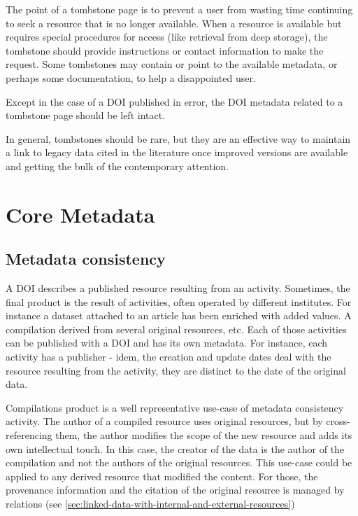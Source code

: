 \documentclass[11pt,a4paper]{ivoa}
\begin{document}
The point of a tombstone page is to prevent a user from wasting time continuing to seek a resource that is no longer available. When a resource is available but requires special procedures for access (like retrieval from deep storage), the tombstone should provide instructions or contact information to make the request. Some tombstones may contain or point to the available metadata, or perhaps some documentation, to help a disappointed user.

Except in the case of a DOI published in error, the DOI metadata related to a tombstone page should be left intact.

In general, tombstones should be rare, but they are an effective way to maintain a link to legacy data cited in the literature once improved versions are available and getting the bulk of the contemporary attention.

\section{Core Metadata}\hypertarget{core-metadata}{}\label{sec:core-metadata}

\subsection{Metadata consistency}\hypertarget{metadata-consistency}{}\label{sec:metadata-consistency}

A DOI describes a published resource resulting from an activity.  \newline
Sometimes, the final product is the result of activities, often operated by different institutes. For instance a dataset attached to an article has been enriched with added values. A compilation derived from several original resources, etc.\newline
Each of those activities can be published with a DOI and has its own metadata. For instance, each activity has a publisher -  idem,  the creation and update dates deal with the resource resulting from the activity, they are distinct to the date of the original data.

Compilations product is a well representative use-case of metadata consistency activity. The author of a compiled resource uses original resources, but by cross-referencing them, the author modifies the scope of the new resource and adds its own intellectual touch. In this case, the creator of the data is the author of the compilation and not the authors of the original resources. This use-case could be applied to any derived resource that modified the content. For those, the provenance information and the citation of the original resource is managed by relations (see \ref{sec:linked-data-with-internal-and-external-resources})
\end{document}
